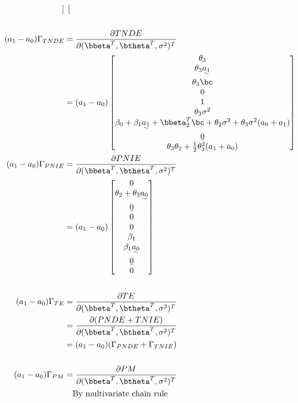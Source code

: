 \documentclass[dvipdfmx,10pt]{article}
\begin{document}
\begin{align*}
\begin{bmatrix}
    \end{bmatrix}\\
  \\
  (a_{1}-a_{0})\Gamma_{TNDE}
  &= \frac{\partial TNDE}{\partial (\bbeta^{T},\btheta^{T},\sigma^2)^{T}}\\
  &= (a_{1}-a_{0})
    \begin{bmatrix}
      \theta_{3}\\
      \theta_{3}\uwave{a_{1}}\\
      \theta_{3}\bc\\
      0\\
      1\\
      \theta_{3}\sigma^{2}\\
      \beta_{0} + \beta_{1}\uwave{a_{1}} + \bbeta_{2}^{T}\bc + \theta_{2}\sigma^{2} + \theta_{3}\sigma^{2}(a_{0} + a_{1})\\
      \b0\\
      \theta_{3}\theta_{2} + \frac{1}{2}\theta_{3}^{2}(a_{1} + a_{0})\\
    \end{bmatrix}\\
  (a_{1}-a_{0})\Gamma_{PNIE}
  &= \frac{\partial PNIE}{\partial (\bbeta^{T},\btheta^{T},\sigma^2)^{T}}\\
  &= (a_{1}-a_{0})
    \begin{bmatrix}
      0\\
      \theta_{2} + \theta_{3}\uwave{a_{0}}\\
      \b0\\
      0\\
      0\\
      \beta_{1}\\
      \beta_{1}\uwave{a_{0}}\\
      \b0\\
      0\\
    \end{bmatrix}\\
  \\
  (a_{1}-a_{0})\Gamma_{TE}
  &= \frac{\partial TE}{\partial (\bbeta^{T},\btheta^{T},\sigma^2)^{T}}\\
  &= \frac{\partial (PNDE+TNIE)}{\partial (\bbeta^{T},\btheta^{T},\sigma^2)^{T}}\\
  &= (a_{1}-a_{0})(\Gamma_{PNDE} + \Gamma_{TNIE})\\
  \\
  (a_{1}-a_{0})\Gamma_{PM}
  &= \frac{\partial PM}{\partial (\bbeta^{T},\btheta^{T},\sigma^2)^{T}}\\
  &~~~\text{By multivariate chain rule}\\

\end{align*}
\end{document}
